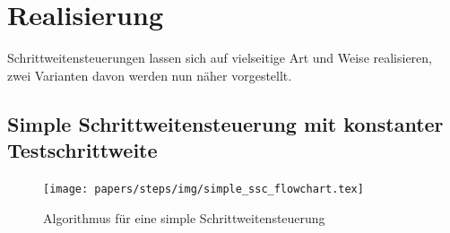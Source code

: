%
%
%
\section{Realisierung
  \label{steps:section:loesung}}
Schrittweitensteuerungen lassen sich auf vielseitige Art und Weise realisieren,
zwei Varianten davon werden nun näher vorgestellt.

\subsection{Simple Schrittweitensteuerung mit konstanter Testschrittweite
\label{steps:subsection:simplestep}}

\begin{figure}
  \centering
  \texttt{[image: papers/steps/img/simple\_ssc\_flowchart.tex]}
  \caption{Algorithmus für eine simple Schrittweitensteuerung
    \label{buch:steps:flowchartSimple}}
\end{figure}

